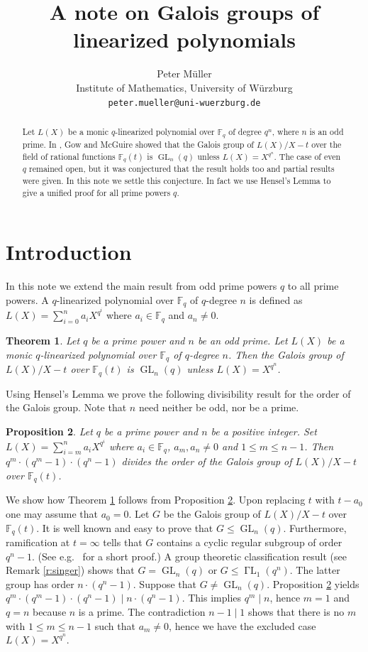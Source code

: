\documentclass[12pt]{article}
\theoremstyle{plain}
\newtheorem{theorem}{Theorem}%
\newtheorem{proposition}[theorem]{Proposition}
\theoremstyle{definition}
\newcommand{\FF}{\mathbb F}
\DeclareMathOperator{\gL}{\Gamma L}
\DeclareMathOperator{\GL}{GL}
\begin{document}
\title{A note on Galois groups of linearized polynomials}
\author{Peter M\"uller\\[1mm]
  Institute of Mathematics, University of W\"urzburg\\
  \texttt{peter.mueller@uni-wuerzburg.de}}
\maketitle
\begin{abstract}
  Let $L(X)$ be a monic $q$-linearized polynomial over $\FF_q$ of
  degree $q^n$, where $n$ is an odd prime. In \cite{gow_mcguire_glnq},
  Gow and McGuire showed that the Galois group of $L(X)/X-t$ over the
  field of rational functions $\FF_q(t)$ is $\GL_n(q)$ unless
  $L(X)=X^{q^n}$. The case of even $q$ remained open, but it was
  conjectured that the result holds too and partial results were
  given. In this note we settle this conjecture. In fact we use
  Hensel's Lemma to give a unified proof for all prime powers $q$.
\end{abstract}
\section{Introduction}
In this note we extend the main result \cite[Theorem
2]{gow_mcguire_glnq} from odd prime powers $q$ to all prime powers. A
$q$-linearized polynomial over $\FF_q$ of $q$-degree $n$ is defined as
$L(X)=\sum_{i=0}^na_iX^{q^i}$ where $a_i\in\FF_q$ and $a_n\ne0$.
\begin{theorem}\label{t:main}
  Let $q$ be a prime power and $n$ be an odd prime. Let $L(X)$ be a
  monic $q$-linearized polynomial over $\FF_q$ of $q$-degree $n$. Then
  the Galois group of $L(X)/X-t$ over $\FF_q(t)$ is $\GL_n(q)$ unless
  $L(X)=X^{q^n}$.%
\end{theorem}
Using Hensel's Lemma we prove the following divisibility result for
the order of the Galois group. Note that $n$ need neither be odd, nor
be a prime.
\begin{proposition}\label{p:main}
  Let $q$ be a prime power and $n$ be a positive integer. Set
  $L(X)=\sum_{i=m}^na_iX^{q^i}$ where $a_i\in\FF_q$, $a_m, a_n\ne0$
  and $1\le m\le n-1$. Then $q^m\cdot(q^m-1)\cdot(q^n-1)$ divides the
  order of the Galois group of $L(X)/X-t$ over $\FF_q(t)$.
\end{proposition}
We show how Theorem \ref{t:main} follows from Proposition
\ref{p:main}. Upon replacing $t$ with $t-a_0$ one may assume that
$a_0=0$. Let $G$ be the Galois group of $L(X)/X-t$ over $\FF_q(t)$. It
is well known and easy to prove that $G\le\GL_n(q)$. Furthermore,
ramification at $t=\infty$ tells that $G$ contains a cyclic regular
subgroup of order $q^n-1$. (See e.g.\ \cite[Lemma 3.3]{Turnwald:Schur}
for a short proof.) A group theoretic classification result (see
Remark \ref{r:singer}) shows that $G=\GL_n(q)$ or
$G\le\gL_1(q^n)$. The latter group has order $n\cdot(q^n-1)$. Suppose
that $G\ne\GL_n(q)$. Proposition \ref{p:main} yields
$q^m\cdot(q^m-1)\cdot(q^n-1)\mid n\cdot(q^n-1)$. This implies
$q^m\mid n$, hence $m=1$ and $q=n$ because $n$ is a prime. The
contradiction $n-1\mid1$ shows that there is no $m$ with
$1\le m\le n-1$ such that $a_m\ne0$, hence we have the excluded case
$L(X)=X^{q^n}$.
\end{document}

